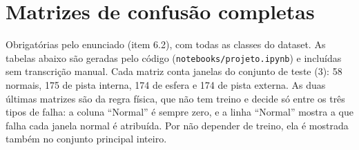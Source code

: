 \chapter{Matrizes de confusão completas}
\label{ap:matrizes}

Obrigatórias pelo enunciado (item 6.2), com todas as classes do dataset. As
tabelas abaixo são geradas pelo código
(\texttt{notebooks/projeto.ipynb}) e incluídas sem transcrição
manual. Cada matriz conta janelas do conjunto de teste (\SI{3}{\hp}): 58 normais,
175 de pista interna, 174 de esfera e 174 de pista externa.
As duas últimas matrizes são da regra física, que não tem treino e decide só
entre os três tipos de falha: a coluna ``Normal'' é sempre zero, e a linha
``Normal'' mostra a que falha cada janela normal é atribuída. Por não depender de
treino, ela é mostrada também no conjunto principal inteiro.


